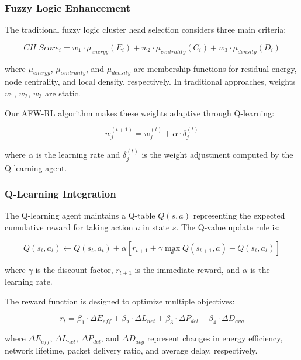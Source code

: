 \documentclass[conference]{IEEEtran}
\begin{document}
\subsubsection{Fuzzy Logic Enhancement}

The traditional fuzzy logic cluster head selection considers three main criteria:

\begin{equation}
CH\_Score_i = w_1 \cdot \mu_{energy}(E_i) + w_2 \cdot \mu_{centrality}(C_i) + w_3 \cdot \mu_{density}(D_i)
\end{equation}

where $\mu_{energy}$, $\mu_{centrality}$, and $\mu_{density}$ are membership functions for residual energy, node centrality, and local density, respectively. In traditional approaches, weights $w_1$, $w_2$, $w_3$ are static.

Our AFW-RL algorithm makes these weights adaptive through Q-learning:

\begin{equation}
w_j^{(t+1)} = w_j^{(t)} + \alpha \cdot \delta_j^{(t)}
\end{equation}

where $\alpha$ is the learning rate and $\delta_j^{(t)}$ is the weight adjustment computed by the Q-learning agent.

\subsubsection{Q-Learning Integration}

The Q-learning agent maintains a Q-table $Q(s,a)$ representing the expected cumulative reward for taking action $a$ in state $s$. The Q-value update rule is:

\begin{equation}
Q(s_t, a_t) \leftarrow Q(s_t, a_t) + \alpha [r_{t+1} + \gamma \max_a Q(s_{t+1}, a) - Q(s_t, a_t)]
\end{equation}

where $\gamma$ is the discount factor, $r_{t+1}$ is the immediate reward, and $\alpha$ is the learning rate.

The reward function is designed to optimize multiple objectives:

\begin{equation}
r_t = \beta_1 \cdot \Delta E_{eff} + \beta_2 \cdot \Delta L_{net} + \beta_3 \cdot \Delta P_{del} - \beta_4 \cdot \Delta D_{avg}
\end{equation}

where $\Delta E_{eff}$, $\Delta L_{net}$, $\Delta P_{del}$, and $\Delta D_{avg}$ represent changes in energy efficiency, network lifetime, packet delivery ratio, and average delay, respectively.
\end{document}
